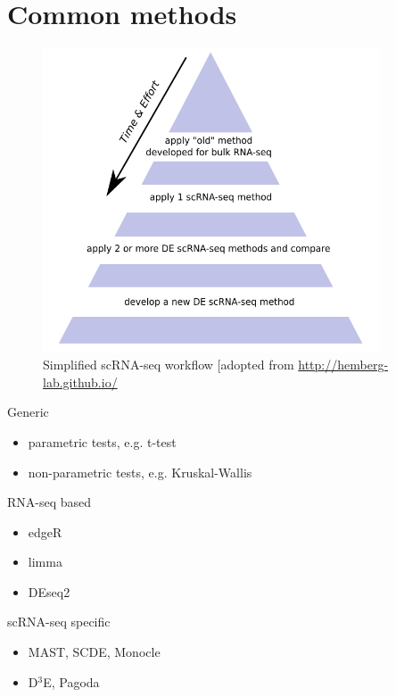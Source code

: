 \documentclass{beamer}\usepackage[]{graphicx}\usepackage[]{color}
\begin{document}
\section{Common methods}
\begin{frame}
\begin{center}
\insertsection
\end{center}
\end{frame}

\begin{frame}
\begin{center}
\begin{figure}
\includegraphics[width=10cm]{Images/solutionTriangle.png}
\caption{Simplified scRNA-seq workflow [adopted from \href{http://hemberg-lab.github.io/]}{http://hemberg-lab.github.io/}}
\end{figure}
\end{center}
\end{frame}

\begin{frame} \pause
\begin{block}{Generic}
\begin{itemize}
  \item parametric tests, e.g. t-test
  \item non-parametric tests, e.g. Kruskal-Wallis
\end{itemize}
\end{block} \pause
\begin{block}{RNA-seq based}
\begin{itemize}
  \item edgeR
  \item limma
  \item DEseq2 
\end{itemize}
\end{block} \pause
\begin{block}{scRNA-seq specific}
\begin{itemize}
  \item MAST, SCDE, Monocle
  \item D$^3$E, Pagoda
 \end{itemize}
\end{block}
\end{frame}
\end{document}
